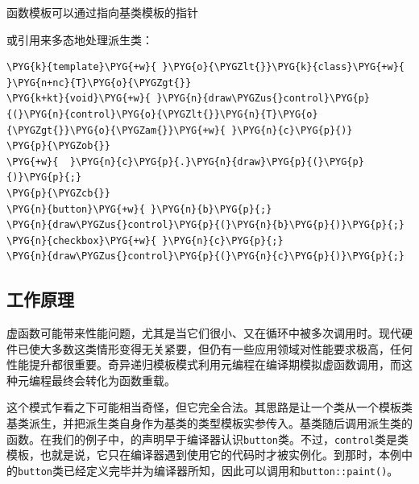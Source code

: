 
函数模板可以通过指向基类模板的指针



或引用来多态地处理派生类：



\begin{codeblockbg}
\begin{Verbatim}[commandchars=\\\{\},breaklines=true,breakanywhere=true,fontsize=\codefont,xleftmargin=17bp]
\PYG{k}{template}\PYG{+w}{ }\PYG{o}{\PYGZlt{}}\PYG{k}{class}\PYG{+w}{ }\PYG{n+nc}{T}\PYG{o}{\PYGZgt{}}
\PYG{k+kt}{void}\PYG{+w}{ }\PYG{n}{draw\PYGZus{}control}\PYG{p}{(}\PYG{n}{control}\PYG{o}{\PYGZlt{}}\PYG{n}{T}\PYG{o}{\PYGZgt{}}\PYG{o}{\PYGZam{}}\PYG{+w}{ }\PYG{n}{c}\PYG{p}{)}
\PYG{p}{\PYGZob{}}
\PYG{+w}{  }\PYG{n}{c}\PYG{p}{.}\PYG{n}{draw}\PYG{p}{(}\PYG{p}{)}\PYG{p}{;}
\PYG{p}{\PYGZcb{}}
\PYG{n}{button}\PYG{+w}{ }\PYG{n}{b}\PYG{p}{;}
\PYG{n}{draw\PYGZus{}control}\PYG{p}{(}\PYG{n}{b}\PYG{p}{)}\PYG{p}{;}
\PYG{n}{checkbox}\PYG{+w}{ }\PYG{n}{c}\PYG{p}{;}
\PYG{n}{draw\PYGZus{}control}\PYG{p}{(}\PYG{n}{c}\PYG{p}{)}\PYG{p}{;}
\end{Verbatim}
\end{codeblockbg}



\subsection{工作原理}



虚函数可能带来性能问题，尤其是当它们很小、又在循环中被多次调用时。现代硬件已使大多数这类情形变得无关紧要，但仍有一些应用领域对性能要求极高，任何性能提升都很重要。奇异递归模板模式利用元编程在编译期模拟虚函数调用，而这种元编程最终会转化为函数重载。



这个模式乍看之下可能相当奇怪，但它完全合法。其思路是让一个类从一个模板类基类派生，并把派生类自身作为基类的类型模板实参传入。基类随后调用派生类的函数。在我们的例子中，的声明早于编译器认识\texttt{button}类。不过，\texttt{control}类是类模板，也就是说，它只在编译器遇到使用它的代码时才被实例化。到那时，本例中的\texttt{button}类已经定义完毕并为编译器所知，因此可以调用和\texttt{button::\allowbreak{}paint()}。



